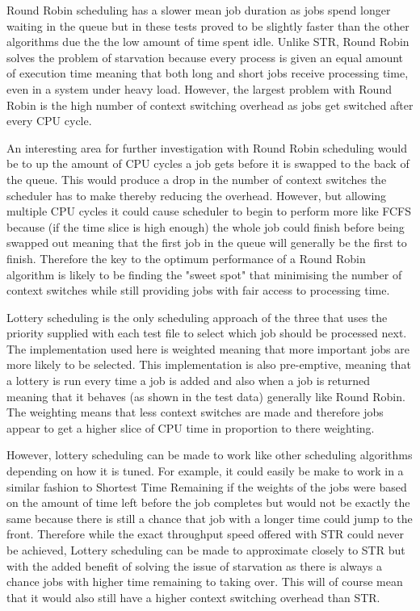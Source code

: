 \documentclass{acm_proc_article-sp}
\begin{document}
Round Robin scheduling has a slower mean job duration as jobs spend longer waiting in the queue but in these tests proved to be slightly faster than the other algorithms due the the low amount of time spent idle. Unlike STR, Round Robin solves the problem of starvation because every process is given an equal amount of execution time meaning that both long and short jobs receive processing time, even in a system under heavy load. However, the largest problem with Round Robin is the high number of context switching overhead as jobs get switched after every CPU cycle.

An interesting area for further investigation with Round Robin scheduling would be to up the amount of CPU cycles a job gets before it is swapped to the back of the queue. This would produce a drop in the number of context switches the scheduler has to make thereby reducing the overhead. However, but allowing multiple CPU cycles it could cause scheduler to begin to perform more like FCFS because (if the time slice is high enough) the whole job could finish before being swapped out meaning that the first job in the queue will generally be the first to finish. Therefore the key to  the optimum performance of a Round Robin algorithm is likely to be finding the "sweet spot" that minimising the number of context switches while still providing jobs with fair access to processing time.

Lottery scheduling is the only scheduling approach of the three that uses the priority supplied with each test file to select which job should be processed next. The implementation used here is weighted meaning that more important jobs are more likely to be selected. This implementation is also pre-emptive, meaning that a lottery is run every time a job is added and also when a job is returned meaning that it behaves (as shown in the test data) generally like Round Robin. The weighting means that less context switches are made and therefore jobs appear to get a higher slice of CPU time in proportion to there weighting.

However, lottery scheduling can be made to work like other scheduling algorithms depending on how it is tuned. For example, it could easily be make to work in a similar fashion to Shortest Time Remaining if the weights of the jobs were based on the amount of time left before the job completes but would not be exactly the same because there is still a chance that job with a longer time could jump to the front. Therefore while the exact throughput speed offered with STR could never be achieved, Lottery scheduling can be made to approximate closely to STR but with the added benefit of solving the issue of starvation as there is always a chance jobs with higher time remaining to taking over. This will of course mean that it would also still have a higher context switching overhead than STR.
\end{document}

